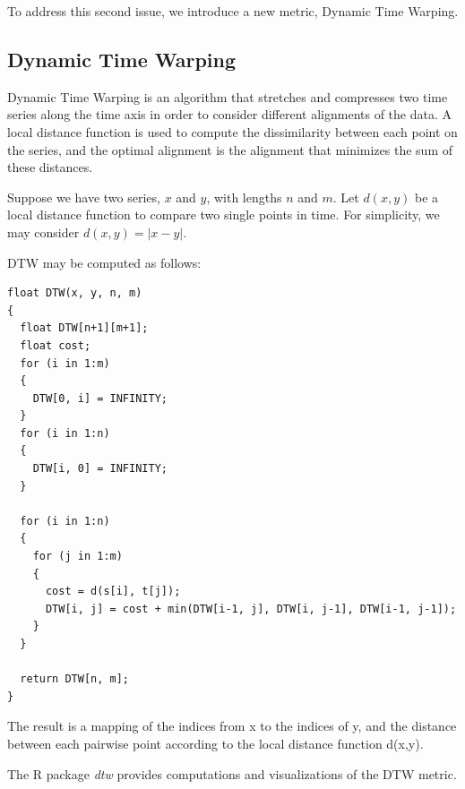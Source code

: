 \documentclass{article}
\begin{document}
To address this second issue, we introduce a new metric, Dynamic Time Warping.

\subsection{Dynamic Time Warping}

Dynamic Time Warping is an algorithm that stretches and compresses two time 
series along the time axis in order to consider different alignments of the data.
A local distance function is used to compute the dissimilarity between each point
on the series, and the optimal alignment is the alignment that minimizes the sum
of these distances.  

Suppose we have two series, $x$ and $y$, with lengths $n$ and $m$.  Let $d(x,y)$ 
be a local distance function to compare two single points in time.  For simplicity, 
we may consider $d(x,y) = |x - y|$.

DTW may be computed as follows:

\begin{verbatim}
float DTW(x, y, n, m) 
{
  float DTW[n+1][m+1];
  float cost;
  for (i in 1:m)
  {
    DTW[0, i] = INFINITY;
  }
  for (i in 1:n)
  {
    DTW[i, 0] = INFINITY;
  }

  for (i in 1:n)
  {
    for (j in 1:m)
    {
      cost = d(s[i], t[j]);
      DTW[i, j] = cost + min(DTW[i-1, j], DTW[i, j-1], DTW[i-1, j-1]);
    }
  }

  return DTW[n, m];
}
\end{verbatim}

The result is a mapping of the indices from x to the indices of y, and the
distance between each pairwise point according to the local distance function d(x,y).

The R package \textit{dtw} \autocite{DTW} provides computations and visualizations
of the DTW metric.  
\end{document}
